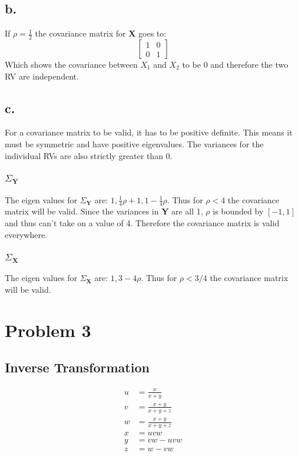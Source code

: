 \documentclass[12pt]{article}
\begin{document}
\subsection{b.}
If $\rho = \frac{1}{2}$ the covariance matrix for \textbf{X} goes to:
\[
  \begin{bmatrix}
    1 & 0 \\
    0 & 1
  \end{bmatrix}
\]
Which shows the covariance between $X_1$ and $X_2$ to be 0 and therefore the two RV are independent. 

\subsection{c.}
For a covariance matrix to be valid, it has to be positive definite. This means it must be symmetric and have positive eigenvalues.
The variances for the individual RVs are also strictly greater than 0.
\subsubsection{$\Sigma_{\bm{Y}}$}
The eigen values for $\Sigma_{\bm{Y}}$ are: $1, \frac{1}{4}\rho + 1, 1 - \frac{1}{4}\rho$. Thus for $\rho < 4$ the covariance matrix
will be valid. Since the variances in \textbf{Y} are all 1, $\rho$ is bounded by $[-1,1]$ and thus can't take on a value of 4. Therefore
the covariance matrix is valid everywhere.

\subsubsection{$\Sigma_{\bm{X}}$}
The eigen values for $\Sigma_{\bm{X}}$ are: $1, 3 - 4\rho$. Thus for $\rho < 3/4$ the covariance matrix will be valid. 

\section{Problem 3}
\subsection{Inverse Transformation}
\begin{align*}
  u &= \frac{x}{x + y} \\
  v &= \frac{x + y}{x+y+z} \\
  w &= \frac{x + y}{x+y+z} \\
  x &= uvw \\
  y &= vw - uvw \\
  z &= w - vw \\
\end{align*}
\end{document}
